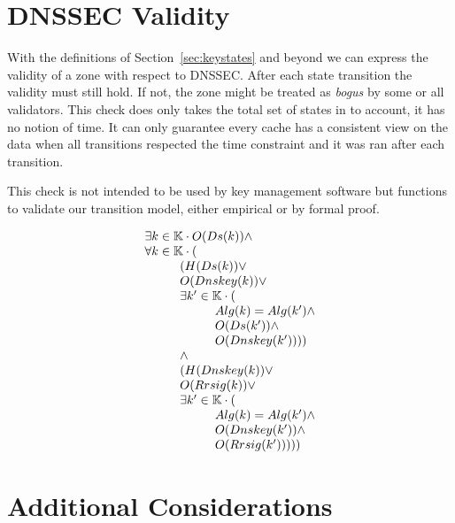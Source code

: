 \documentclass[twoside,english, a4paper]{article}
\begin{document}
\section{DNSSEC Validity} \label{validity}

With the definitions of Section~\ref{sec:keystates} and beyond we can
express the validity of a zone with respect to DNSSEC. After each state
transition the validity must still hold. If not, the zone might be treated as
\emph{bogus} by some or all validators. This check does only takes the 
total set of states in to account, it has no notion of time. It can
only guarantee every cache has a consistent view on the data when all
transitions respected the time constraint and it was ran after each
transition.

This check is not intended to be used by key management software but
functions to validate our transition model, either empirical or by 
formal proof.

\begin{equation}
\begin{array}{l}
				\exists k \in \mathbb{K} \cdot O(Ds(k))
				\wedge \\
				\forall k \in \mathbb{K} \cdot (\\
\hskip 1cm			(H(Ds(k)) \vee \\
\hskip 1cm			O(Dnskey(k)) \vee \\
\hskip 1cm				\exists k' \in \mathbb{K} \cdot (\\
\hskip 2cm				Alg(k) = Alg(k') \wedge \\
\hskip 2cm				O(Ds(k')) \wedge \\
\hskip 2cm				O(Dnskey(k')) )) \\
\hskip 1cm			\wedge\\
\hskip 1cm			(H(Dnskey(k)) \vee \\
\hskip 1cm			O(Rrsig(k)) \vee \\
\hskip 1cm			\exists k' \in \mathbb{K} \cdot (\\
\hskip 2cm				Alg(k) = Alg(k') \wedge \\
\hskip 2cm				O(Dnskey(k')) \wedge \\
\hskip 2cm				O(Rrsig(k')) )))
\end{array}
\end{equation}

\section{Additional Considerations}
\end{document}
